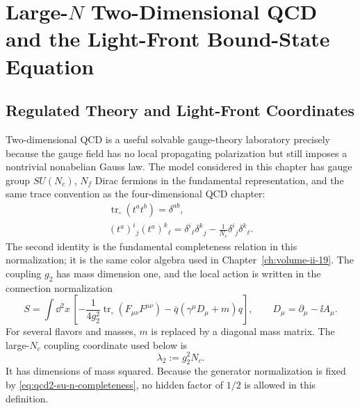 \chapter{\texorpdfstring{Large-\(N\) Two-Dimensional QCD and the Light-Front Bound-State Equation}{Large-N Two-Dimensional QCD and the Light-Front Bound-State Equation}}
\label{ch:large-n-two-dimensional-qcd-light-front}
\ConventionsLorentzian

\section{Regulated Theory and Light-Front Coordinates}

Two-dimensional QCD is a useful solvable gauge-theory laboratory precisely
because the gauge field has no local propagating polarization but still
imposes a nontrivial nonabelian Gauss law.  The model considered in this
chapter has gauge group \(SU(N_c)\), \(N_f\) Dirac fermions in the fundamental
representation, and the same trace convention as the four-dimensional QCD
chapter:
\begin{equation}
\begin{gathered}
  \operatorname{tr}_{\square}(t^at^b)=\delta^{ab},
  \\
  (t^a)^i{}_j(t^a)^k{}_\ell
  =
  \delta^i{}_\ell\delta^k{}_j
  -\frac1{N_c}\delta^i{}_j\delta^k{}_\ell .
\end{gathered}
\label{eq:qcd2-su-n-completeness}
\end{equation}
The second identity is the fundamental completeness relation in this
normalization; it is the same color algebra used in
Chapter~\ref{ch:volume-ii-19}.  The coupling \(g_2\) has mass dimension one,
and the local action is written in the connection normalization
\begin{equation}
  S
  =
  \int\dd^2x\,
  \left[
    -\frac1{4g_2^2}\operatorname{tr}_{\square}(F_{\mu\nu}F^{\mu\nu})
    -\bar q(\gamma^\mu D_\mu+m)q
  \right],
  \qquad
  D_\mu=\partial_\mu-\ii A_\mu .
  \label{eq:qcd2-action}
\end{equation}
For several flavors and masses, \(m\) is replaced by a diagonal mass matrix.
The large-\(N_c\) coupling coordinate used below is
\begin{equation}
  \lambda_2:=g_2^2N_c .
  \label{eq:qcd2-thooft-coupling}
\end{equation}
It has dimensions of mass squared.  Because the generator normalization is
fixed by \eqref{eq:qcd2-su-n-completeness}, no hidden factor of \(1/2\) is
allowed in this definition.

